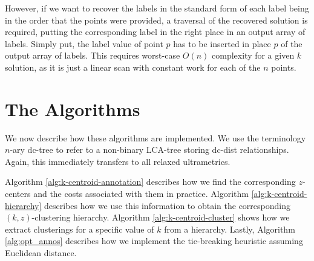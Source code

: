 However, if we want to recover the labels in the standard form of each label being in the order that the points were provided, a traversal of the recovered solution is required, putting the corresponding label in the right place in an output array of labels. Simply put, the label value of point $p$ has to be inserted in place $p$ of the output array of labels. This requires worst-case $O(n)$ complexity for a given $k$ solution, as it is just a linear scan with constant work for each of the $n$ points.  



\section{The Algorithms}

We now describe how these algorithms are implemented. We use the terminology $n$-ary dc-tree to refer to a non-binary LCA-tree storing dc-dist relationships. Again, this immediately transfers to all relaxed ultrametrics.


Algorithm \ref{alg:k-centroid-annotation} describes how we find the corresponding $z$-centers and the costs associated with them in practice. Algorithm \ref{alg:k-centroid-hierarchy} describes how we use this information to obtain the corresponding $(k, z)$-clustering hierarchy. Algorithm \ref{alg:k-centroid-cluster} shows how we extract clusterings for a specific value of $k$ from a hierarchy. Lastly, Algorithm \ref{alg:opt_annos} describes how we implement the tie-breaking heuristic assuming Euclidean distance.



\renewcommand{\cost}{\text{cost}} %
\newcommand{\id}{\text{id}}
\newcommand{\parent}{\text{parent}} 
\renewcommand{\children}{\text{children}}
\renewcommand{\dist}{\text{dist}}
\newcommand{\size}{\text{size}}
\newcommand{\tree}{\text{tree}}
\newcommand{\cent}{\text{center}}
\newcommand{\add}{\text{add}}
\newcommand{\costDec}{costDecrease}



